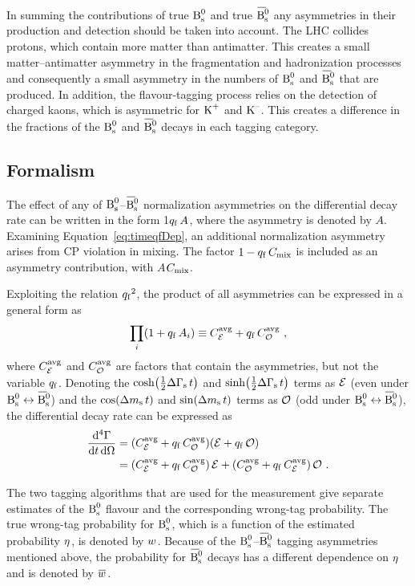 In summing the contributions of true $\text{B}_\text{s}^\text{0}$ and true $\Bsbar$ any asymmetries in their production and detection should be taken into
account. The LHC collides protons, which contain more matter than antimatter. This creates a small matter--antimatter asymmetry in the
fragmentation and hadronization processes and consequently a small asymmetry in the numbers of $\text{B}_\text{s}^\text{0}$ and $\Bsbar$ that are produced. In
addition, the flavour-tagging process relies on the detection of charged kaons, which is asymmetric for $\text{K}^\text{+}$ and $\text{K}^\text{--}$. This creates a
difference in the fractions of the $\text{B}_\text{s}^\text{0}$ and $\Bsbar$ decays in each tagging category.


\subsection{Formalism}
\label{subsec:ana_tagging_form}

The effect of any of $\text{B}_\text{s}^\text{0}$--$\Bsbar$ normalization asymmetries on the differential decay rate can be written in the form 1\textplus${q_\mathrm{f}}\,
A$, where the asymmetry is denoted by $A$. Examining Equation~\ref{eq:timeqfDep}, an additional normalization asymmetry arises from CP
violation in mixing. The factor $1-{q_\mathrm{f}}\,C_\text{mix}$ is included as an asymmetry contribution, with $A$\texteq\tm$C_\text{mix}$.

Exploiting the relation ${q_\mathrm{f}}^2$\texteq{}, the product of all asymmetries can be expressed in a general form as
\begin{equation}
  \label{eq:asymProd}
  \prod_i (1+{q_\mathrm{f}}\, A_i) \equiv {\ensuremath{C_{\mathcal{E}_{}}^{\text{avg}}}} + {q_\mathrm{f}}\,{C_{\mathcal{O}_{}}^{\text{avg}}} \ ,
\end{equation}
where ${C_{\mathcal{E}_{}}^{\text{avg}}}$ and ${C_{\mathcal{O}_{}}^{\text{avg}}}$ are factors that contain the asymmetries, but not the variable ${q_\mathrm{f}}$. Denoting the $\cosh\!\left(\tfrac{1}{2}\Delta\Gamma_\text{s}\, t\right)$ and $\sinh\!\left(\tfrac{1}{2}\Delta\Gamma_\text{s}\, t\right)$
terms as $\mathcal{E}$ (even under $\Bs\leftrightarrow\Bsbar$) and the $\cos\!\left(\Delta m_\text{s}\, t\right)$ and $\sin\!\left(\Delta m_\text{s}\, t\right)$ terms as $\mathcal{O}$ (odd under
$\Bs\leftrightarrow\Bsbar$), the differential decay rate can be expressed as
\begin{equation}
  \label{eq:diffRateAsym}
  \begin{aligned}
    \frac{\mathrm{d}^4\Gamma}{\mathrm{d} t\, \mathrm{d}\Omega}
      &= ({C_{\mathcal{E}_{}}^{\text{avg}}} + {q_\mathrm{f}}\,{C_{\mathcal{O}_{}}^{\text{avg}}}) (\mathcal{E} + {q_\mathrm{f}}\,\mathcal{O}) \\
      &= ({C_{\mathcal{E}_{}}^{\text{avg}}} + {q_\mathrm{f}}\,{C_{\mathcal{O}_{}}^{\text{avg}}})\, \mathcal{E} + ({C_{\mathcal{O}_{}}^{\text{avg}}} + {q_\mathrm{f}}\,{C_{\mathcal{E}_{}}^{\text{avg}}})\, \mathcal{O} \ .
  \end{aligned}
\end{equation}

The two tagging algorithms that are used for the \BstoJpsiKK{} measurement give separate estimates of the $\text{B}_\text{s}^\text{0}$ flavour and the
corresponding wrong-tag probability. The true wrong-tag probability for $\text{B}_\text{s}^\text{0}$, which is a function of the estimated probability $\eta^{}$,
is denoted by $w^{}$. Because of the $\text{B}_\text{s}^\text{0}$--$\Bsbar$ tagging asymmetries mentioned above, the probability for $\Bsbar$ decays has a
different dependence on $\eta^{}$ and is denoted by $\wTagBar$.

